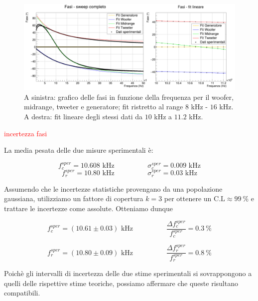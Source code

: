 \documentclass[12pt,italian]{article}
\newcommand{\err}[1]{\textcolor{red}{#1}}
\begin{document}
\begin{figure}[h]
	\centering
	\includegraphics[width=\textwidth]{fig_fase.png}
	\caption{A sinistra: grafico delle fasi in funzione della frequenza per il woofer, midrange, tweeter e generatore;
		fit ristretto al range $8$ kHz - $16$ kHz. A destra: fit lineare degli stessi dati da $10$ kHz a $11.2$ kHz.}\label{fig:phase_sweep}
\end{figure}

\err{incertezza fasi}

La media pesata delle due misure sperimentali è:

\begin{equation*}
	f_{c}^{sper} = 10.608 \text{ kHz}  \hspace{2cm}  \sigma_c^{sper} = 0.009 \text{ kHz}
\end{equation*}
\begin{equation*}
	f_{r}^{sper} = 10.80 \text{ kHz}  \hspace{2cm}  \sigma_r^{sper} = 0.03  \text{ kHz}
\end{equation*}

Assumendo che le incertezze statistiche provengano da una popolazione
gaussiana, utilizziamo un fattore di copertura $k = 3$ per ottenere un
$\text{C.L}\approx 99 \ \% $ e trattare le incertezze come assolute. Otteniamo
dunque

\begin{equation*}
	f_{c}^{sper} = (10.61 \pm 0.03) \text{ kHz} \hspace{2cm} \frac{\Delta f_{c}^{sper}}{f_{c}^{sper}} = 0.3 \ \%
\end{equation*}

\begin{equation*}
	f_{r}^{sper} = (10.80 \pm 0.09) \text{ kHz} \hspace{2cm} \frac{\Delta f_{r}^{sper}}{f_{r}^{sper}} = 0.8 \ \%
\end{equation*}

Poichè gli intervalli di incertezza delle due stime sperimentali si
sovrappongono a quelli delle rispettive stime teoriche, possiamo affermare che
queste risultano compatibili.
\end{document}
